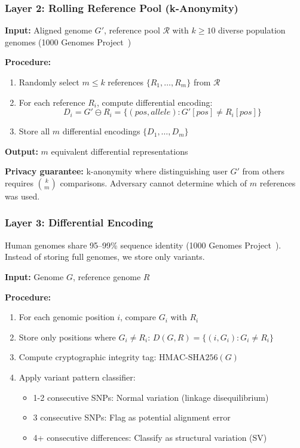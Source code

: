 \documentclass[12pt,a4paper]{article}
\begin{document}
\subsubsection{Layer 2: Rolling Reference Pool (k-Anonymity)}

\textbf{Input:} Aligned genome $G'$, reference pool $\mathcal{R}$ with $k \geq 10$ diverse population genomes (1000 Genomes Project~\cite{Genomes2015})

\textbf{Procedure:}
\begin{enumerate}
\item Randomly select $m \leq k$ references $\{R_1, \ldots, R_m\}$ from $\mathcal{R}$
\item For each reference $R_i$, compute differential encoding:
\[
D_i = G' \ominus R_i = \{(pos, allele) : G'[pos] \neq R_i[pos]\}
\]
\item Store all $m$ differential encodings $\{D_1, \ldots, D_m\}$
\end{enumerate}

\textbf{Output:} $m$ equivalent differential representations

\textbf{Privacy guarantee:} k-anonymity where distinguishing user $G'$ from others requires $\binom{k}{m}$ comparisons. Adversary cannot determine which of $m$ references was used.

\subsubsection{Layer 3: Differential Encoding}

Human genomes share 95--99\% sequence identity (1000 Genomes Project~\cite{Genomes2015}). Instead of storing full genomes, we store only variants.

\textbf{Input:} Genome $G$, reference genome $R$

\textbf{Procedure:}
\begin{enumerate}
\item For each genomic position $i$, compare $G_i$ with $R_i$
\item Store only positions where $G_i \neq R_i$: $D(G,R) = \{(i, G_i) : G_i \neq R_i\}$
\item Compute cryptographic integrity tag: $\text{HMAC-SHA256}(G)$
\item Apply variant pattern classifier:
  \begin{itemize}
  \item 1-2 consecutive SNPs: Normal variation (linkage disequilibrium)
  \item 3 consecutive SNPs: Flag as potential alignment error
  \item 4+ consecutive differences: Classify as structural variation (SV)
  \end{itemize}
\end{enumerate}
\end{document}
